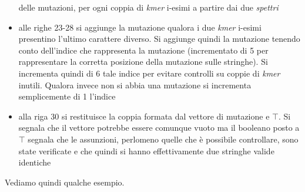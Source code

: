 \documentclass[a4paper,12pt, oneside]{book}
\begin{document}
\begin{itemize}
  delle mutazioni, per ogni coppia di \textit{kmer} i-esimi a
  partire dai due \textit{spettri}
  \item alle righe 23-28 si aggiunge la mutazione qualora i due \textit{kmer}
  i-esimi presentino l'ultimo carattere diverso. Si aggiunge quindi la mutazione
  tenendo conto dell'indice che rappresenta la mutazione (incrementato di 5 per
  rappresentare la corretta posizione della mutazione sulle stringhe). Si
  incrementa quindi di 6 tale indice 
  per evitare controlli su coppie di \textit{kmer} inutili. Qualora invece non
  si abbia una mutazione si incrementa semplicemente di 1 l'indice
  \item alla riga 30 si restituisce la coppia formata dal vettore di
  mutazione e $\top$. Si segnala che il vettore potrebbe essere comunque vuoto
  ma il booleano posto a $\top$ segnala che le assunzioni, perlomeno quelle che
  è possibile controllare, sono state verificate e che quindi si hanno
  effettivamente due stringhe valide identiche
\end{itemize}
Vediamo quindi qualche esempio.
\end{document}
